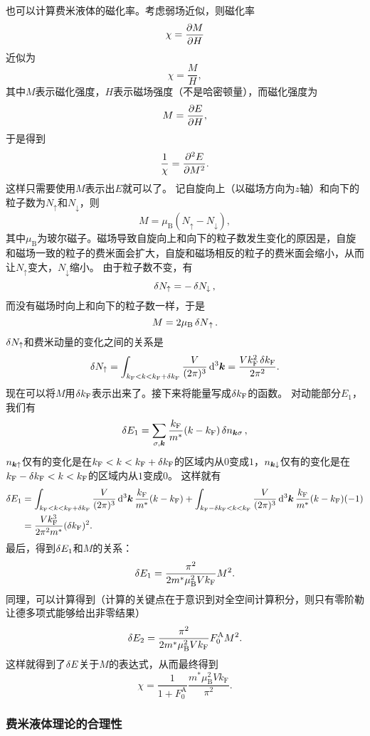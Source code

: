 也可以计算费米液体的磁化率。考虑弱场近似，则磁化率
\[
    \chi = \pdv{M}{H}
\]
近似为
\[
    \chi = \frac{M}{H},
\]
其中$M$表示磁化强度，$H$表示磁场强度（不是哈密顿量），而磁化强度为
\[
    M = \pdv{E}{H},
\]
于是得到
\[
    \frac{1}{\chi} = \pdv[2]{E}{M}.
\]
这样只需要使用$M$表示出$E$就可以了。
记自旋向上（以磁场方向为$z$轴）和向下的粒子数为$N_\uparrow$和$N_\downarrow$，则
\[
    M = \mu_\text{B} (N_\uparrow - N_\downarrow),
\]
其中$\mu_\text{B}$为玻尔磁子。磁场导致自旋向上和向下的粒子数发生变化的原因是，自旋和磁场一致的粒子的费米面会扩大，自旋和磁场相反的粒子的费米面会缩小，从而让$N_\uparrow$变大，$N_\downarrow$缩小。
由于粒子数不变，有
\[
    \var{N_\uparrow} = - \var{N_\downarrow},
\]
而没有磁场时向上和向下的粒子数一样，于是
\[
    M = 2 \mu_\text{B} \var{N}_\uparrow.
\]
$\var{N_\uparrow}$和费米动量的变化之间的关系是
\[
    \var{N_\uparrow} = \int_{k_\text{F} < k < k_\text{F} + \var{k_\text{F}}} \frac{V}{(2\pi)^3} \dd[3]{\vb*{k}} = \frac{V k_\text{F}^2 \var{k_\text{F}}}{2\pi^2}.
\]
现在可以将$M$用$\var{k_\text{F}}$表示出来了。接下来将能量写成$\var{k_\text{F}}$的函数。
对动能部分$E_1$，我们有
\[
    \var{E_1} = \sum_{\sigma, \vb*{k}} \frac{k_\text{F}}{m^*} (k - k_\text{F}) \var{n}_{\vb*{k} \sigma},
\]
$n_{\vb*{k} \uparrow}$仅有的变化是在$k_\text{F} < k < k_\text{F} + \var{k_\text{F}}$的区域内从$0$变成$1$，$n_{\vb*{k} \downarrow}$仅有的变化是在$k_\text{F} - \var{k_\text{F}} < k < k_\text{F}$的区域内从$1$变成$0$。
这样就有
\[
    \begin{aligned}
        \var{E_1} &= \int_{k_\text{F} < k < k_\text{F} + \var{k_\text{F}}} \frac{V}{(2\pi)^3} \dd[3]{\vb*{k}} \frac{k_\text{F}}{m^*} (k - k_\text{F}) + \int_{k_\text{F} - \var{k_\text{F}} < k < k_\text{F}} \frac{V}{(2\pi)^3} \dd[3]{\vb*{k}} \frac{k_\text{F}}{m^*} (k - k_\text{F}) (-1) \\
        &= \frac{V k_\text{F}^3}{2 \pi^2 m^*} (\var{k_\text{F}})^2.
    \end{aligned}
\]
最后，得到$\var{E_1}$和$M$的关系：
\[
    \var{E_1} = \frac{\pi^2}{2 m^* \mu_\text{B}^2 V k_\text{F}} M^2.
\]
同理，可以计算得到（计算的关键点在于意识到对全空间计算积分，则只有零阶勒让德多项式能够给出非零结果）
\[
    \var{E_2} = \frac{\pi^2}{2 m^* \mu_\text{B}^2 V k_\text{F}} F_0^\text{A} M^2.
\]
这样就得到了$\var{E}$关于$M$的表达式，从而最终得到
\begin{equation}
    \chi = \frac{1}{1 + F_0^\text{A}} \frac{m^* \mu_\text{B}^2 V k_\text{F}}{\pi^2}.
\end{equation}

\subsubsection{费米液体理论的合理性}

